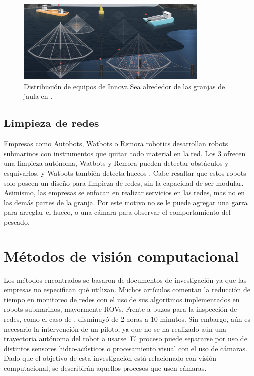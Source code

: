 \begin{figure} [!h]
    \begin{center}
    \includegraphics[height=4cm]{images/InnovaSea_1} 
    \caption{\label{fig:InnovaSea_sistema} Distribución de equipos de Innova Sea alrededor de las granjas de jaula en  \cite{InnovaSea}.}
    \end{center}
\end{figure}


\subsection{Limpieza de redes}
Empresas como Autobots, Watbots o Remora robotics desarrollan robots submarinos con instrumentos que quitan todo material en la red. Los 3 ofrecen una limpieza autónoma,  Watbots y Remora pueden detectar obstáculos y esquivarlos, y Watbots también detecta huecos \cite{Watbots}. Cabe resaltar que estos robots solo poseen un diseño para limpieza de redes, sin la capacidad de ser modular. Asimismo, las empresas se enfocan en realizar servicios en las redes, mas no en las demás partes de la granja. Por este motivo no se le puede agregar una garra para arreglar el hueco, o una cámara para observar el comportamiento del pescado. 


\section{Métodos de visión computacional}
Los métodos encontrados se basaron de documentos de investigación ya que las empresas no especifican qué utilizan. Muchos artículos comentan la reducción de tiempo en monitoreo de redes con el uso de sus algoritmos implementados en robots submarinos, mayormente ROVs. Frente a buzos para la inspección de redes, como el caso de \cite{cite:Betancourt}, disminuyó de 2 horas a 10 minutos. Sin embargo, aún es necesario la intervención de un piloto, ya que no se ha realizado aún una trayectoria autónoma del robot a usarse. El proceso puede separarse por uso de distintos sensores hidro-acústicos o procesamiento visual con el uso de cámaras. Dado que el objetivo de esta investigación está relacionado con visión computacional, se describirán aquellos procesos que usen cámaras.  

